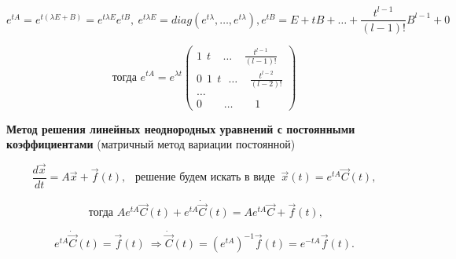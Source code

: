 \[ e^{tA} = e^{t(\lambda E + B)} = e^{t\lambda E}e^{tB},\ e^{t\lambda E} = diag(e^{t\lambda}, \dots, e^{t\lambda}), e^{tB} = E + tB + \dots + \frac{t^{l-1}}{(l-1)!}B^{l-1} + 0 \]

\begin{equation*}
	\text{тогда } e^{tA} = e^{\lambda t}
 	\begin{pmatrix}
            1\ \ t\ \ \ \ \  \dots\ \ \ \ \ \frac{t^{l-1}}{(l-1)!} \\
            0\ \ 1\ \ t\ \ \ \dots\ \ \ \ \  \frac{t^{l-2}}{(l-2)!} \\
            \dots \\
            0\ \ \ \ \ \ \ \ \ \dots\ \ \ \ \ \ \ \ \  1
    \end{pmatrix}
\end{equation*}

\textbf{Метод решения линейных неоднородных уравнений с постоянными коэффициентами} (матричный метод вариации постоянной)

\[ \frac{d\overrightarrow{x}}{dt} = A\overrightarrow{x} + \overrightarrow{f}(t),\ \ \text{ решение будем искать в виде } \ \overrightarrow{x}(t) = e^{tA}\overrightarrow{C}(t), \]

\[ \text{ тогда } Ae^{tA}\overrightarrow{C}(t) + e^{tA}\dot{\overrightarrow{C}}(t) = Ae^{tA}\overrightarrow{C} + \overrightarrow{f}(t),\]

\[ e^{tA}\dot{\overrightarrow{C}}(t) = \overrightarrow{f}(t)\ \Rightarrow \dot{\overrightarrow{C}}(t) = (e^{tA})^{-1}\overrightarrow{f}(t) = e^{-tA}\overrightarrow{f}(t). \]

\newpage
